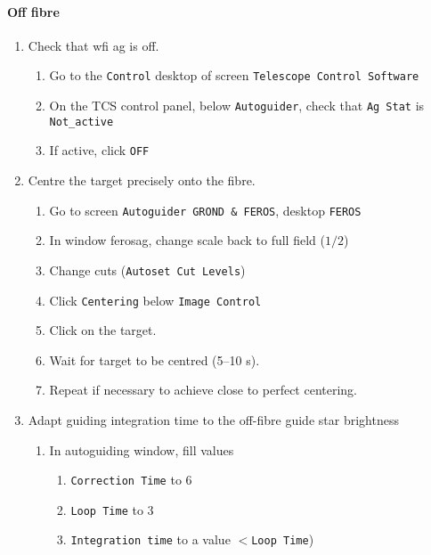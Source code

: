\documentclass[11pt,fleqn,a4paper]{book}
\begin{document}
\paragraph{Off fibre}

\label{proc:guideferosoff}
\begin{enumerate}
    \item Check that \gls{wfi} \gls{ag} is off.
    \begin{enumerate}
        \item Go to the \texttt{Control} \gls{desktop} of screen \texttt{Telescope Control Software}
        \item On the \gls{TCS control panel}, below \texttt{Autoguider}, check that \texttt{Ag Stat} is \texttt{Not\_active}
        \item If active, click \texttt{OFF} 
    \end{enumerate}
    \item Centre the target precisely onto the fibre.
    \begin{enumerate}
        \item Go to screen \texttt{Autoguider GROND \& FEROS}, \gls{desktop} \texttt{FEROS}
        \item In window \gls{ferosag}, change scale back to full field ($1/2$) 
        \item Change cuts (\texttt{Autoset Cut Levels})
        \item Click \texttt{Centering} below \texttt{Image Control}
        \item Click on the target.
        \item Wait for target to be centred (5--10 s).
        \item Repeat if necessary to achieve close to perfect centering.
    \end{enumerate}
    \item Adapt guiding integration time to the off-fibre guide star brightness
    \begin{enumerate}
        \item In \gls{autoguiding} window, fill values
            \begin{enumerate}
                \item \texttt{Correction Time} to 6
                \item \texttt{Loop Time} to 3
                \item \texttt{Integration time} to a value $< $\texttt{Loop Time})
            \end{enumerate}

\end{enumerate}
\end{enumerate}
\end{document}
